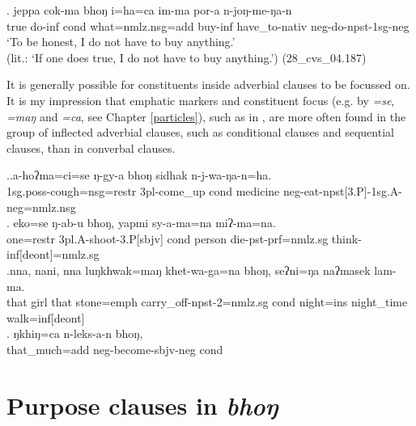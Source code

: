 \exg.	jeppa cok-ma  bhoŋ  i=ha=ca                        im-ma  por-a          n-joŋ-me-ŋa-n\\
		true  do{\sc -inf} {\sc cond}  what={\sc nmlz.nsg=add} buy{\sc -inf} have\_to{\sc -nativ} {\sc neg-}do{\sc -npst-1sg-neg}\\
		‘To be honest, I do not have to buy anything.’\\
		(lit.: ‘If one does true, I do not have to buy anything.’) (28\_cvs\_04.187)

It is generally possible for constituents inside adverbial clauses to be focussed on. It is my impression that emphatic markers and constituent focus (e.g. by \emph{=se}, \emph{=maŋ} and \emph{=ca}, see Chapter \ref{particles}), such as in \Next, are more often found in the group of inflected adverbial clauses, such as conditional clauses and sequential clauses, than in converbal clauses.

\ex.\ag.\label{coughcond}a-hoʔma=ci=se ŋ-gy-a bhoŋ sidhak n-j-wa-ŋa-n=ha.\\
{\sc 1sg.poss-}cough{\sc =nsg=restr}  {\sc 3pl-}come\_up {\sc cond} medicine {\sc neg-}eat{\sc -npst[3.P]-1sg.A-neg=nmlz.nsg}\\
\bg. eko=se          ŋ-ab-u                  bhoŋ, yapmi  sy-a-ma=na                       miʔ-ma=na.\\
one{\sc =restr} {\sc 3pl.A-}shoot{\sc -3.P[sbjv]} {\sc cond} person die{\sc -pst-prf=nmlz.sg} think{\sc -inf[deont]=nmlz.sg}\\
 
\bg.nna,  nani,  nna  luŋkhwak=maŋ   khet-wa-ga=na                   bhoŋ, seʔni=ŋa       naʔmasek  lam-ma.\\
that girl that stone{\sc =emph} carry\_off{\sc -npst-2=nmlz.sg} {\sc cond} night{\sc =ins} night\_time walk{\sc =inf[deont]}\\
 
\bg. ŋkhiŋ=ca       n-leks-a-n         bhoŋ, \\
that\_much{\sc =add} {\sc neg-}become{\sc [3]-sbjv-neg} {\sc cond}\\
	
	
	

\section{Purpose clauses in \emph{bhoŋ}}\label{adv-cl-fin-purp}

